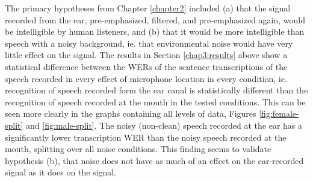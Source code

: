 

The primary hypotheses from Chapter \ref{chapter2} included (a) that the signal recorded from the ear, pre-emphasized, filtered, and pre-emphasized again, would be intelligible by human listeners, and (b) that it would be more intelligible than speech with a noisy background, ie. that environmental noise would have very little effect on the signal.  The results in Section \ref{chap3:results} above show a statistical difference between the WERs of the sentence transcriptions of the speech recorded in every \DIFdelbegin {}\DIFdelend \DIFaddbegin {}\DIFaddend effect of microphone location in every condition, ie. recognition of speech recorded form the ear canal is statistically different than the recognition of speech recorded at the mouth in the tested conditions.  This can be seen more clearly in the graphs containing all levels of data, Figures \ref{fig:female-split} and \ref{fig:male-split}.  The noisy (non-clean) speech recorded at the ear has a significantly lower transcription WER than the noisy speech recorded at the mouth, splitting over all noise conditions.  This finding seems to validate hypothesis (b), that noise \DIFdelbegin {}\DIFdelend does not have as much of an effect on the ear-recorded signal as it does on the \DIFdelbegin {}\DIFdelend \DIFaddbegin {}\DIFaddend signal.

